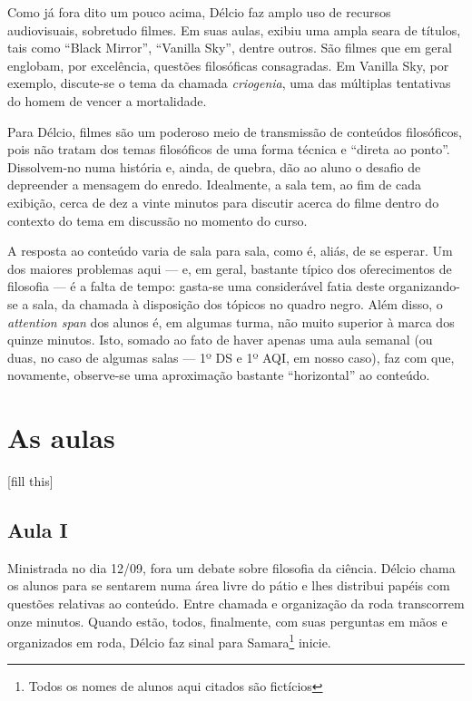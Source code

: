 \documentclass[12pt,a4paper]{article}
\begin{document}
    Como já fora dito um pouco acima, Délcio faz amplo uso de recursos 
    audiovisuais, sobretudo filmes. Em suas aulas, exibiu uma ampla seara 
    de títulos, tais como ``Black Mirror'', ``Vanilla Sky'', dentre outros. 
    São filmes que em geral englobam, por excelência, questões filosóficas 
    consagradas. Em Vanilla Sky, por exemplo, discute-se o tema da chamada 
    \textit{criogenia}, uma das múltiplas tentativas do homem de vencer a 
    mortalidade. 
    
    Para Délcio, filmes são um poderoso meio de transmissão de conteúdos 
    filosóficos, pois não tratam dos temas filosóficos de uma forma técnica e 
    ``direta ao ponto''. Dissolvem-no numa história e, ainda, de quebra, dão ao 
    aluno o desafio de depreender a mensagem do enredo. Idealmente, a sala tem, 
    ao fim de cada exibição, cerca de dez a vinte minutos para discutir acerca 
    do filme dentro do contexto do tema em discussão no momento do curso. 
    
    A resposta ao conteúdo varia de sala para sala, como é, aliás, de se 
    esperar. Um dos maiores problemas aqui --- e, em geral, bastante típico 
    dos oferecimentos de filosofia --- é a falta de tempo: gasta-se 
    uma considerável fatia deste organizando-se a sala, da chamada à disposição 
    dos tópicos no quadro negro. Além disso, o \textit{attention span} dos 
    alunos é, em algumas turma, não muito superior à marca dos quinze minutos. 
    Isto, somado ao fato de haver apenas uma aula semanal (ou duas, no caso de 
    algumas salas --- 1º DS e 1º AQI, em nosso caso), faz com que, novamente, 
    observe-se uma aproximação bastante ``horizontal'' ao conteúdo. 
    	
	\newpage
	
	\section{As aulas}
	
	[fill this]

    \subsection*{Aula I}
    
    Ministrada no dia 12/09, fora um debate sobre filosofia da ciência. Délcio 
    chama os alunos para se sentarem numa área livre do pátio e lhes distribui 
    papéis com questões relativas ao conteúdo. Entre chamada e organização da 
    roda transcorrem onze minutos. Quando estão, todos, finalmente, com suas 
    perguntas em mãos e organizados em roda, Délcio faz sinal para 
    Samara\footnote{Todos os nomes de alunos aqui citados são fictícios} 
    inicie. 
    
\end{document}
